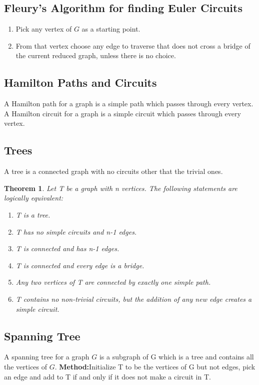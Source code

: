 \documentclass{article}
\newtheorem{thm}{Theorem}
\begin{document}
\begin{spacing}{1.5}
\subsection{Fleury's Algorithm for finding Euler Circuits}
\begin{enumerate}
    \item Pick any vertex of $G$ as a starting point. 
    \item From that vertex choose any edge to traverse that does not cross a bridge of the current reduced graph, unless there is no choice.
\end{enumerate}
\subsection{Hamilton Paths and Circuits}
A Hamilton path for a graph is a simple path which passes through every vertex. 
A Hamilton circuit for a graph is a simple circuit which passes through every vertex. 
\subsection{Trees}
A tree is a connected graph with no circuits other that the trivial ones. 
\begin{thm}
    Let T be a graph with n vertices. The following statements are logically equivalent:
    \begin{enumerate}
        \item T is a tree.
        \item T has no simple circuits and n-1 edges.
        \item T is connected and has n-1 edges.
        \item T is connected and every edge is a bridge. 
        \item Any two vertices of T are connected by exactly one simple path. 
        \item T contains no non-trivial circuits, but the addition of any new edge creates a simple circuit. 
    \end{enumerate}
\end{thm}
\subsection{Spanning Tree}
A spanning tree for a graph $G$ is a subgraph of G which is a tree and contains all the vertices of $G$.  
\textbf{Method:}Initialize T to be the vertices of G but not edges, pick an edge and add to T if and only if it does not make a circuit in T. 

\end{spacing}
\end{document}
